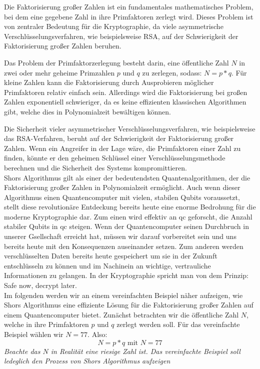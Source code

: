 Die Faktorisierung großer Zahlen \cite[S189]{bernsteinPostquantumCryptography2017} ist ein fundamentales mathematisches Problem, 
bei dem eine gegebene Zahl in ihre Primfaktoren zerlegt wird.
Dieses Problem ist von zentraler Bedeutung für die Kryptographie, da viele asymmetrische Verschlüsselungsverfahren, wie beispielsweise RSA, 
auf der Schwierigkeit der Faktorisierung großer Zahlen beruhen.

Das Problem der Primfaktorzerlegung besteht darin, eine öffentliche Zahl $N$ in zwei oder mehr geheime Primzahlen $p$ und $q$ zu zerlegen, sodass: $N = p*q$. 
Für kleine Zahlen kann die Faktorisierung durch Ausprobieren möglicher Primfaktoren relativ einfach sein. 
Allerdings wird die Faktorisierung bei großen Zahlen exponentiell schwieriger, 
da es keine effizienten klassischen Algorithmen gibt, welche dies in Polynomialzeit bewältigen können.

Die Sicherheit vieler asymmetrischer Verschlüsselungsverfahren, 
wie beispielsweise das RSA-Verfahren, beruht auf der Schwierigkeit der Faktorisierung großer Zahlen. 
Wenn ein Angreifer in der Lage wäre, die Primfaktoren einer Zahl zu finden, 
könnte er den geheimen Schlüssel einer Verschlüsselungsmethode berechnen und die Sicherheit des Systems kompromittieren.\\

Shors Algorithmus \cite{shorAlgorithmsQuantumComputation1994} gilt als einer der bedeutendsten Quantenalgorithmen, 
der die Faktorisierung großer Zahlen in Polynomialzeit ermöglicht. 
Auch wenn dieser Algorithmus einen Quantencomputer mit vielen, stabilen Qubits voraussetzt, 
stellt diese revolutionäre Entdeckung bereits heute eine enorme Bedrohung für die moderne Kryptographie dar.
Zum einen wird effektiv an \ac{qc} geforscht, die Anzahl stabiler Qubits in \ac{qc} steigen. 
Wenn der Quantencomputer seinen Durchbruch in unserer Gsellschaft erreicht hat, müssen wir darauf vorbereitet sein und uns bereits heute mit den Konsequenzen auseinander setzen. 
Zum anderen werden verschlüsselten Daten bereits heute gespeichert um sie in der Zukunft entschlüsseln zu können und 
im Nachinein an wichtige, vertrauliche Informationen zu gelangen. In der Kryptographie spricht man von dem Prinzip: \glqq Safe now, decrypt later\grqq.\\

Im folgenden \cite{kakLecture12PublicKey}\cite[S. 4-5]{gidneyHowFactor20482021} werden wir an einem vereinfachten Beispiel näher aufzeigen, 
wie Shors Algorithmus eine effiziente Lösung für die Faktorisierung großer Zahlen auf einem Quantencomputer bietet.
Zunächst betrachten wir die öffentliche Zahl $N$, welche in ihre Primfaktoren $p$ und $q$ zerlegt werden soll. 
Für das vereinfachte Beispiel wählen wir $N = 77$. Also: $$N = p*q \textrm{ mit } N= 77$$
\textit{Beachte das $N$ in Realität eine riesige Zahl ist. Das vereinfachte Beispiel soll ledeglich den Prozess von Shors Algorithmus aufzeigen}

